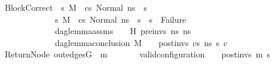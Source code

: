\begin{isabellebody}
\ \ \ BlockCorrect{\isacharcolon}{\kern0pt}\ {\isachardoublequoteopen}{\isasymAnd}\ s{}{\isacharprime}{\kern0pt}{\isacharprime}{\kern0pt}{\isachardot}{\kern0pt}\ M{\isacharcomma}{\kern0pt}{\isasymLambda}{\isacharcomma}{\kern0pt}{\isasymGamma}{\isacharcomma}{\kern0pt}{\isasymOmega}\ {\isasymturnstile}\ {\isasymlangle}cs{}{\isacharcomma}{\kern0pt}\ Normal\ ns{}{\isasymrangle}\ {\isacharbrackleft}{\kern0pt}{\isasymrightarrow}{\isacharbrackright}{\kern0pt}\ s{}{\isacharprime}{\kern0pt}{\isacharprime}{\kern0pt}\ {\isasymLongrightarrow}\isanewline
\ \ \ \ \ \ \ \ \ \ \ \ \ \ \ {\isacharparenleft}{\kern0pt}{\isasymAnd}s{}{\isacharprime}{\kern0pt}{\isachardot}{\kern0pt}\ {\isacharparenleft}{\kern0pt}M{\isacharcomma}{\kern0pt}{\isasymLambda}{\isacharcomma}{\kern0pt}{\isasymGamma}{\isacharcomma}{\kern0pt}{\isasymOmega}\ {\isasymturnstile}\ {\isasymlangle}cs{}{\isacharcomma}{\kern0pt}\ Normal\ ns{}{\isasymrangle}\ {\isacharbrackleft}{\kern0pt}{\isasymrightarrow}{\isacharbrackright}{\kern0pt}\ s{}{\isacharprime}{\kern0pt}{\isacharparenright}{\kern0pt}\ {\isasymLongrightarrow}\ s{}{\isacharprime}{\kern0pt}\ {\isasymnoteq}\ Failure{\isacharparenright}{\kern0pt}\ {\isasymLongrightarrow}\isanewline
\ \ \ \ \ \ \ \ \ \ \ \ \ \ \ dag{\isacharunderscore}{\kern0pt}lemma{\isacharunderscore}{\kern0pt}assms\ {\isasymLambda}\ {\isasymGamma}\ {\isasymOmega}\ H\ pre{\isacharunderscore}{\kern0pt}invs\ ns{}\ ns{}\ \ {\isasymLongrightarrow}\ \ \ \ \ \ \isanewline
\ \ \ \ \ \ \ \ \ \ \ \ \ \ \ dag{\isacharunderscore}{\kern0pt}lemma{\isacharunderscore}{\kern0pt}conclusion\ M\ {\isasymLambda}\ {\isasymGamma}\ {\isasymOmega}\ post{\isacharunderscore}{\kern0pt}invs\ cs{}\ ns{}\ s{}{\isacharprime}{\kern0pt}{\isacharprime}{\kern0pt}\ c{\isachardoublequoteclose}\ \isanewline
\ \ \ ReturnNode{\isacharcolon}{\kern0pt}\ {\isachardoublequoteopen}out{\isacharunderscore}{\kern0pt}edges{\isacharparenleft}{\kern0pt}G{}{\isacharparenright}{\kern0pt}\ {\isacharbang}{\kern0pt}\ m{}\ {\isacharequal}{\kern0pt}\ {\isacharbrackleft}{\kern0pt}{\isacharbrackright}{\kern0pt}{\isachardoublequoteclose}\ \ \ \isanewline
\ \ {\isachardoublequoteopen}valid{\isacharunderscore}{\kern0pt}configuration\ {\isasymLambda}\ {\isasymGamma}\ {\isasymOmega}\ post{\isacharunderscore}{\kern0pt}invs\ m{\isacharprime}{\kern0pt}\ s{\isacharprime}{\kern0pt}{\isachardoublequoteclose}\isanewline
%
\isadelimproof

\end{isabellebody}
